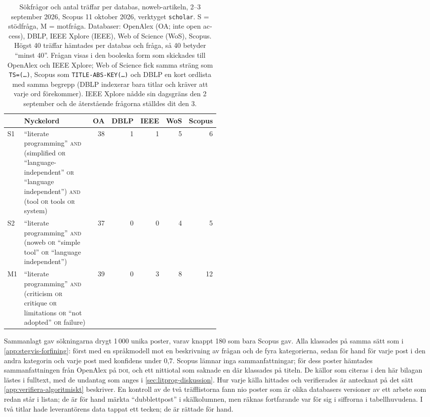 \begin{table}[htbp]
  \centering
  \caption{Sökfrågor och antal träffar per databas, noweb-artikeln,
    2--3 september 2026, Scopus 11 oktober 2026, verktyget \texttt{scholar}.  S = stödfråga, M = motfråga.
    Databaser: OpenAlex (OA; inte \foreignlanguage{english}{open access}),
    DBLP, IEEE Xplore (IEEE), Web of Science (WoS), Scopus.  Högst 40
    träffar hämtades per databas och fråga, så 40 betyder \enquote{minst
    40}.  Frågan visas i den booleska form som skickades till OpenAlex
    och IEEE Xplore; Web of Science fick samma sträng som
    \texttt{TS=(\dots)}, Scopus som \texttt{TITLE-ABS-KEY(\dots)} och DBLP
    en kort ordlista med samma begrepp (DBLP indexerar bara titlar och
    kräver att varje ord förekommer).  IEEE Xplore nådde sin
    dagsgräns den 2 september och de återstående frågorna ställdes dit
    den 3.}
  \label{tab:sok-queries-N}
  \footnotesize
  \begin{tabular}{@{}lp{0.5\linewidth}rrrrr@{}}
    \toprule
    & Nyckelord & OA & DBLP & IEEE & WoS & Scopus \\
    \midrule
    S1 & \enquote{literate programming} \textsc{and} (simplified \textsc{or} \enquote{language-independent} \textsc{or} \enquote{language independent}) \textsc{and} (tool \textsc{or} tools \textsc{or} system)
       & 38 & 1 & 1 & 5 & 6 \\
    S2 & \enquote{literate programming} \textsc{and} (noweb \textsc{or} \enquote{simple tool} \textsc{or} \enquote{language independent})
       & 37 & 0 & 0 & 4 & 5 \\
    \midrule
    M1 & \enquote{literate programming} \textsc{and} (criticism \textsc{or} critique \textsc{or} limitations \textsc{or} \enquote{not adopted} \textsc{or} failure)
       & 39 & 0 & 3 & 8 & 12 \\
    \bottomrule
  \end{tabular}
\end{table}

Sammanlagt gav sökningarna drygt 1\,000 unika poster, varav knappt 180
som bara Scopus gav.  Alla klassades på
samma sätt som i \cref{app:stegvis-forfining}: först med en språkmodell
mot en beskrivning av frågan och de fyra kategorierna, sedan för hand för
varje post i den andra kategorin och varje post med konfidens under 0,7.
Scopus lämnar inga sammanfattningar; för dess poster hämtades
sammanfattningen från OpenAlex på \textsc{doi}, och ett nittiotal som
saknade en där klassades på titeln.
De källor som citeras i den här bilagan lästes i fulltext, med de
undantag som anges i \cref{sec:litprog-diskussion}.  Hur varje källa
hittades och verifierades är antecknat på det sätt
\cref{app:verifiera-algoritmiskt}
beskriver.  En kontroll av de två träfflistorna fann nio poster som
är olika databasers versioner av ett arbete som redan står i listan; de
är för hand märkta \enquote{dubblettpost} i skälkolumnen, men räknas
fortfarande var för sig i siffrorna i tabellhuvudena.  I två titlar
hade leverantörens data tappat ett tecken; de är rättade för hand.

